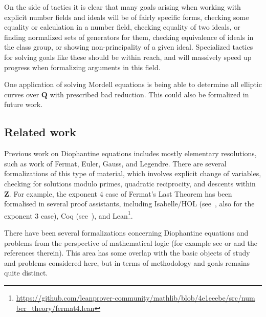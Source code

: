 \documentclass[sigplan,10pt,nonacm,
screen]{acmart} \settopmatter{printfolios=true,printccs=false,printacmref=false}
\newcommand{\ab}[1]{\todo[color=green]{AB: #1}}
\newcommand{\sd}[1]{\todo[color=yellow]{SD: #1}}
\newcommand{\QQ}{\mathbf{Q}}
\newcommand{\ZZ}{\mathbf{Z}}
\begin{document}
On the side of tactics it is clear that many goals arising when working with explicit number fields and ideals will be of fairly specific forms, checking some equality or calculation in a number field, checking equality of two ideals, or finding normalized sets of generators for them, checking equivalence of ideals in the class group, or showing non-principality of a given ideal.
Specialized tactics for solving goals like these should be within reach, and will massively speed up progress when formalizing arguments in this field.

One application of solving Mordell equations is being able to determine all elliptic curves over $\QQ$ with prescribed bad reduction.
This could also be formalized in future work.

\subsection{Related work}\label{sec:Related}

Previous work on Diophantine equations includes mostly elementary resolutions, such as work of Fermat, Euler, Gauss, and Legendre.
There are several formalizations of this type of material, which involves explicit change of variables, checking for solutions modulo primes, quadratic reciprocity, and descents within $\ZZ$.
For example, the exponent 4 case of Fermat's Last Theorem has been formalised in several proof assistants, including Isabelle/HOL (see~\cite{Oosterhuis}, also for the exponent 3 case), Coq (see~\cite{Diophante-Fermat}), and Lean\footnote{\href{https://github.com/leanprover-community/mathlib/blob/4e1eeebe/src/number\_theory/fermat4.lean}{https://github.com/leanprover-community/mathlib/blob/4e1eeebe/src/num}\\
\href{https://github.com/leanprover-community/mathlib/blob/4e1eeebe/src/number\_theory/fermat4.lean}{ber\_theory/fermat4.lean}}.

There have been several formalizations concerning Diophantine equations and problems from the perspective of mathematical logic (for example see \cite{larcheywendling_et_al} or \cite{pak_et_al} and the references therein).
This area has some overlap with the basic objects of study and problems considered here, but in terms of methodology and goals remains quite distinct.
\end{document}
